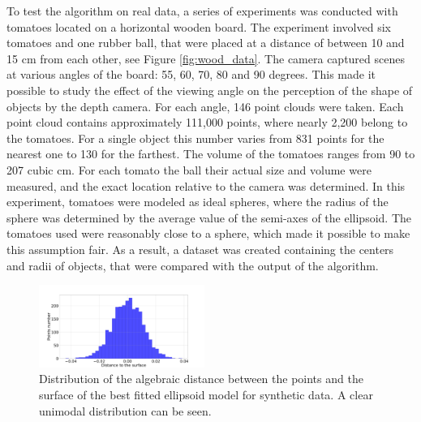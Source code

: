 To test the algorithm on real data, a series of experiments was conducted with tomatoes located on a horizontal wooden board.
The experiment involved six tomatoes and one rubber ball, that were placed at a distance of between 10 and 15 \si{cm} from each other, see Figure \ref{fig:wood_data}.
The camera captured scenes at various angles of the board: 55, 60, 70, 80 and 90 degrees.
This made it possible to study the effect of the viewing angle on the perception of the shape of objects by the depth camera.
For each angle, 146 point clouds were taken.
Each point cloud contains approximately 111,000 points, where nearly 2,200 belong to the tomatoes.
For a single object this number varies from 831 points for the nearest one to 130 for the farthest.
The volume of the tomatoes ranges from 90 to 207 cubic \si{cm}.
For each tomato the ball their actual size and volume were measured, and the exact location relative to the camera was determined.
In this experiment, tomatoes were modeled as ideal spheres, where the radius of the sphere was determined by the average value of the semi-axes of the ellipsoid.
The tomatoes used were reasonably close to a sphere, which made it possible to make this assumption fair.
As a result, a dataset was created containing the centers and radii of objects, that were compared with the output of the algorithm.

\begin{figure}[!htb]
  \centering
      \includegraphics[width=0.48\textwidth]{images/wood_synth_distances_over_real_hist_plot_wood.pdf}
      \caption{Distribution of the algebraic distance between the points and the surface of the best fitted ellipsoid model for synthetic data. A clear unimodal distribution can be seen.}
      \label{fig:hist_for_segment_distances}
\end{figure}

